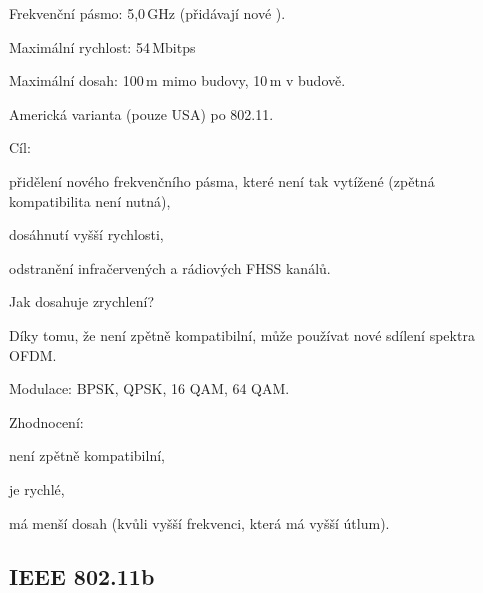 \begin{compactitem}
    \item Frekvenční pásmo: 5,0\,GHz (přidávají nové ).
    \item Maximální rychlost: 54\,Mbitps
    \item Maximální dosah: 100\,m mimo budovy, 10\,m v budově.
    \item Americká varianta (pouze USA) po 802.11.

    \item Cíl: \begin{compactitem}
        \item přidělení nového frekvenčního pásma, které není tak vytížené (zpětná kompatibilita není nutná),
        \item dosáhnutí vyšší rychlosti,
        \item odstranění infračervených a rádiových FHSS kanálů.
    \end{compactitem}

    \item Jak dosahuje zrychlení? \begin{compactitem}
        \item Díky tomu, že není zpětně kompatibilní, může používat nové sdílení spektra OFDM.
    \end{compactitem}

    \item Modulace: BPSK, QPSK, 16 QAM, 64 QAM.

    \item Zhodnocení: \begin{compactitem}
        \item není zpětně kompatibilní,
        \item je rychlé,
        \item má menší dosah (kvůli vyšší frekvenci, která má vyšší útlum).
    \end{compactitem}
\end{compactitem}

\subsection{IEEE 802.11b}

